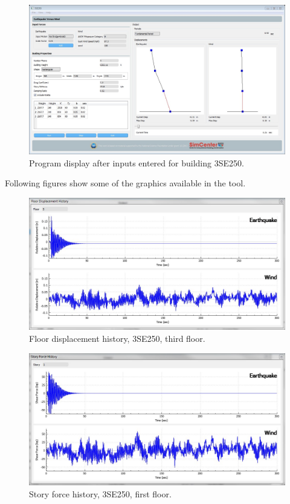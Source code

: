\documentclass[onecolumn, fleqn]{article}
\begin{document}
\begin{figure}[H]
	\centering \includegraphics[width=0.9\linewidth]{3SE250_1.JPG}
	\caption{Program display after inputs entered for building 3SE250.}
\end{figure}
Following figures show some of the graphics available in the tool.
\begin{figure}[H]
	\centering \includegraphics[scale=0.35]{3SE250_fdh.JPG}
	\caption{Floor displacement history, 3SE250, third floor.}
\end{figure}
\begin{figure}[H]
	\centering \includegraphics[scale=0.35]{3SE250_sfh.JPG}
	\caption{Story force history, 3SE250, first floor.}
\end{figure}
\end{document}
